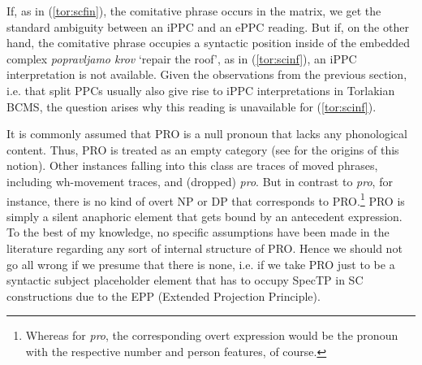 \documentclass[output=paper,colorlinks,citecolor=brown]{langscibook}
\begin{document}
\noindent If, as in (\ref{tor:scfin}), the comitative phrase occurs in the matrix, we get the standard ambiguity between an iPPC  and an ePPC reading. But if, on the other hand, the comitative phrase occupies a syntactic position inside of the embedded complex \textit{popravljamo krov} `repair the roof', as in (\ref{tor:scinf}), an iPPC interpretation is not available. Given the observations from the previous section, i.e. that split PPCs usually also give rise to iPPC interpretations in Torlakian BCMS, the question arises why this reading is unavailable for (\ref{tor:scinf}). 


It is commonly assumed that PRO is a null pronoun that lacks any phonological content. Thus, PRO is treated as an empty category (see \cite{Chomsky1981} for the origins of this notion). Other instances falling into this class are traces of moved phrases, including wh-movement traces, and (dropped) \textit{pro}. But in contrast to \textit{pro}, for instance, there is no kind of overt NP or DP that corresponds to PRO.\footnote{Whereas for \textit{pro}, the corresponding overt expression would be the pronoun with the respective number and person features, of course.} PRO is simply a silent anaphoric element that gets bound by an antecedent expression. To the best of my knowledge, no specific assumptions have been made in the literature regarding any sort of internal structure of PRO. Hence we should not go all wrong if we presume that there is none, i.e. if we take PRO just to be a syntactic subject placeholder element that has to occupy SpecTP in SC constructions due to the EPP (Extended Projection Principle). 
\end{document}

